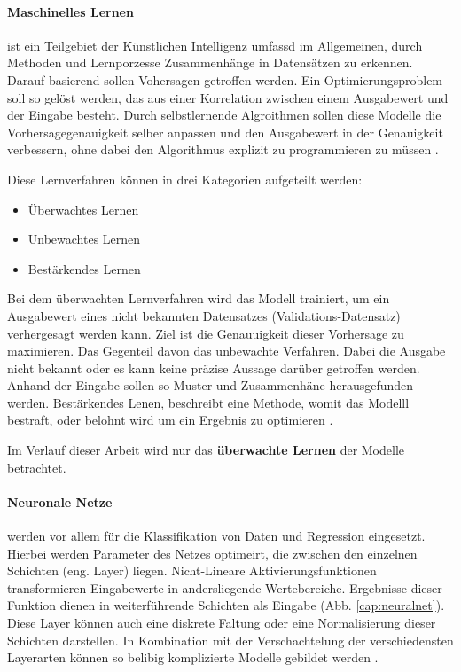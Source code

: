 \paragraph{Maschinelles Lernen} ist ein Teilgebiet der Künstlichen Intelligenz umfassd im Allgemeinen, durch Methoden und Lernporzesse Zusammenhänge in Datensätzen zu erkennen. Darauf basierend sollen Vohersagen getroffen werden. Ein Optimierungsproblem soll so gelöst werden, das aus einer Korrelation zwischen einem Ausgabewert und der Eingabe besteht. Durch selbstlernende Algroithmen sollen diese Modelle die Vorhersagegenauigkeit selber anpassen und den Ausgabewert in der Genauigkeit verbessern, ohne dabei den Algorithmus explizit zu programmieren zu müssen \cite{machinelearning_1} \cite{machinelearning_2}.

Diese  Lernverfahren können in drei Kategorien aufgeteilt werden:
\begin{itemize}
  \setlength\itemsep{-0.5em}
\item Überwachtes Lernen
\item Unbewachtes Lernen
\item Bestärkendes Lernen
\end{itemize}

Bei dem überwachten Lernverfahren wird das Modell trainiert, um ein Ausgabewert eines nicht bekannten Datensatzes (Validations-Datensatz) verhergesagt werden kann. Ziel ist die Genauuigkeit dieser Vorhersage zu maximieren. Das Gegenteil davon das unbewachte Verfahren. Dabei die Ausgabe nicht bekannt oder es kann keine präzise Aussage darüber getroffen werden. Anhand der Eingabe sollen so Muster und Zusammenhäne herausgefunden werden. Bestärkendes Lenen, beschreibt eine Methode, womit das Modelll bestraft, oder belohnt wird um ein Ergebnis zu optimieren \cite{machinelearning_1}.

Im Verlauf dieser Arbeit wird nur das \textbf{überwachte Lernen} der Modelle betrachtet.


\paragraph{Neuronale Netze} werden vor allem für die Klassifikation von Daten und Regression eingesetzt. Hierbei werden Parameter des Netzes optimeirt, die zwischen den einzelnen Schichten (eng. Layer) liegen. Nicht-Lineare Aktivierungsfunktionen transformieren Eingabewerte in andersliegende Wertebereiche. Ergebnisse dieser Funktion dienen in weiterführende Schichten als Eingabe (Abb. \ref{cap:neuralnet}). Diese Layer können auch eine diskrete Faltung oder eine Normalisierung dieser Schichten darstellen. In Kombination mit der Verschachtelung der verschiedensten Layerarten können so belibig komplizierte Modelle gebildet werden \cite{machinelearning_3}.


